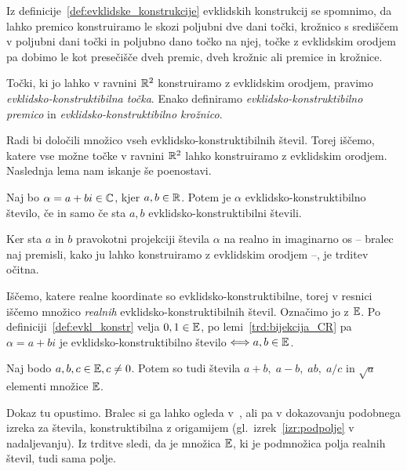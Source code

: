 Iz definicije~\ref{def:evklidske_konstrukcije} evklidskih konstrukcij se spomnimo, da lahko premico konstruiramo le skozi poljubni dve dani točki, krožnico s središčem v poljubni dani točki in poljubno dano točko na njej, točke z evklidskim orodjem pa dobimo le kot presečišče dveh premic, dveh krožnic ali premice in krožnice.

\begin{definicija}
    Točki, ki jo lahko v ravnini $\mathbb R^2$ konstruiramo z evklidskim orodjem, pravimo \emph{evklidsko-konstruktibilna točka}. Enako definiramo \emph{evklidsko-konstruktibilno premico} in \emph{evklidsko-konstruktibilno krožnico}.
\end{definicija}

Radi bi določili množico vseh evklidsko-konstruktibilnih števil. Torej iščemo, katere vse možne točke v ravnini $\mathbb R^2$ lahko konstruiramo z evklidskim orodjem. Naslednja lema nam iskanje še poenostavi.

\begin{lema}
    \label{trd:bijekcija_CR}
    Naj bo $\alpha = a+bi \in \mathbb C$, kjer $a, b \in \mathbb R$. Potem je $\alpha$ evklidsko-konstruktibilno število, če in samo če sta $a, b$ evklidsko-konstruktibilni števili.
\end{lema}
\begin{dokaz}
    Ker sta $a$ in $b$ pravokotni projekciji števila $\alpha$ na realno in imaginarno os -- bralec naj premisli, kako ju lahko konstruiramo z evklidskim orodjem --, je trditev očitna.
\end{dokaz}

Iščemo, katere realne koordinate so evklidsko-konstruktibilne, torej v resnici iščemo množico \emph{realnih} evklidsko-konstruktibilnih števil. Označimo jo z $\mathbb E$. Po definiciji~\ref{def:evkl_konstr} velja $0, 1 \in \mathbb E$, po lemi~\ref{trd:bijekcija_CR} pa $\alpha = a + bi$ je evklidsko-konstruktibilno število $\Longleftrightarrow a, b \in \mathbb E$.

\begin{trditev}
    Naj bodo $a, b, c \in \mathbb E, c \neq 0$. Potem so tudi števila $a+b, \; a-b, \; ab, \; a/c$ in $\sqrt{a}$ elementi množice $\mathbb E$.
\end{trditev}

Dokaz tu opustimo. Bralec si ga lahko ogleda v~\cite{jerman1998}, \cite[str.\ 165--170]{michael2005} ali pa v dokazovanju podobnega izreka za števila, konstruktibilna z origamijem (gl.\ izrek~\ref{izr:podpolje} v nadaljevanju). Iz trditve sledi, da je množica $\mathbb E$, ki je podmnožica polja realnih števil, tudi sama polje.

